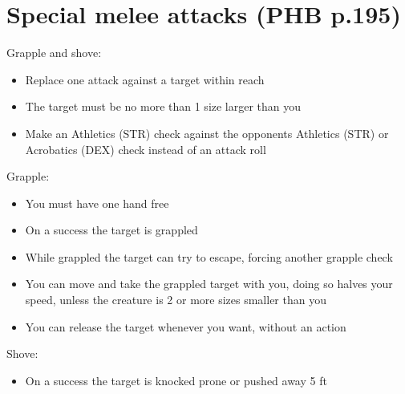 \documentclass[a4paper]{article}
\begin{document}
\section{Special melee attacks \small (PHB p.195)}
Grapple and shove:
\begin{itemize}
\item Replace one attack against a target within reach
\item The target must be no more than 1 size larger than you
\item Make an Athletics (STR) check against the opponents Athletics (STR) or Acrobatics (DEX) check instead of an attack roll
\end{itemize}
Grapple:
\begin{itemize}
\item You must have one hand free
\item On a success the target is grappled
\item While grappled the target can try to escape, forcing another grapple check
\item You can move and take the grappled target with you, doing so halves your speed, unless the creature is 2 or more sizes smaller than you
\item You can release the target whenever you want, without an action
\end{itemize}
Shove:
\begin{itemize}
\item On a success the target is knocked prone or pushed away 5 ft
\end{itemize}
\end{document}

